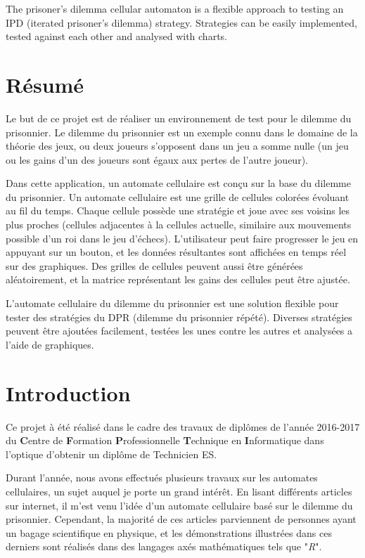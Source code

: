 \documentclass[a4paper]{article}
\begin{document}
The prisoner's dilemma cellular automaton is a flexible approach to testing an IPD (iterated prisoner's dilemma) strategy. Strategies can be easily implemented, tested against each other and analysed with charts.


\section{Résumé}
Le but de ce projet est de réaliser un environnement de test pour le dilemme du prisonnier. Le dilemme du prisonnier est un exemple connu dans le domaine de la théorie des jeux, ou deux joueurs s'opposent dans un jeu a somme nulle (un jeu ou les gains d'un des joueurs sont égaux aux pertes de l'autre joueur).

Dans cette application, un automate cellulaire est conçu sur la base du dilemme du prisonnier. Un automate cellulaire est une grille de cellules colorées évoluant au fil du temps. Chaque cellule possède une stratégie et joue avec ses voisins les plus proches (cellules adjacentes à la cellules actuelle, similaire aux mouvements possible d'un roi dans le jeu d'échecs). L'utilisateur peut faire progresser le jeu en appuyant sur un bouton, et les données résultantes sont affichées en temps réel sur des graphiques. Des grilles de cellules peuvent aussi être générées aléatoirement, et la matrice représentant les gains des cellules peut être ajustée.

L'automate cellulaire du dilemme du prisonnier est une solution flexible pour tester des stratégies du DPR (dilemme du prisonnier répété). Diverses stratégies peuvent être ajoutées facilement, testées les unes contre les autres et analysées a l'aide de graphiques.

\pagebreak
\tableofcontents
\pagebreak

\section{Introduction}
Ce projet à été réalisé dans le cadre des travaux de diplômes de l'année 2016-2017 du \textbf{C}entre de \textbf{F}ormation \textbf{P}rofessionnelle \textbf{T}echnique en \textbf{I}nformatique dans l'optique d'obtenir un diplôme de Technicien ES.

Durant l'année, nous avons effectués plusieurs travaux sur les automates cellulaires, un sujet auquel je porte un grand intérêt. En lisant différents articles sur internet, il m'est venu l'idée d'un automate cellulaire basé sur le dilemme du prisonnier. Cependant, la majorité de ces articles parviennent de personnes ayant un bagage scientifique en physique, et les démonstrations illustrées dans ces derniers sont réalisés dans des langages axés mathématiques tels que "\textit{R}". 
\end{document}
